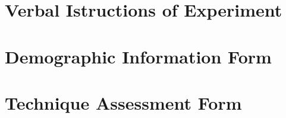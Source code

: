 \chapter{Verbal Istructions of Experiment}
\label{verbalFatFinger}


\chapter{Demographic Information Form}
\label{demographicFatFinger}



\chapter{Technique Assessment Form}
\label{assessmentFatFinger}

